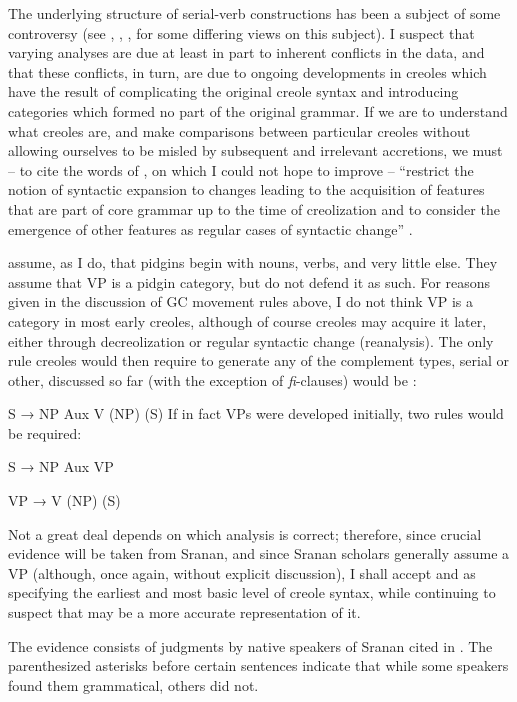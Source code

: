 The underlying structure of serial-verb constructions has been a subject of some controversy (see \citet{Williams1971,Williams1975}, \citet{Roberts1975}, \citet{Voorhoeve1975}, \citet{JansenEtAl1978} for some differing views on this subject). I suspect that varying analyses are due at least in part to inherent conflicts in the data, and that these conflicts, in turn, are due to ongoing developments in creoles which have the result of complicating the original creole syntax and intro\-ducing categories which formed no part of the original grammar. If we are to understand what creoles are, and make comparisons between particular creoles without allowing ourselves to be misled by sub\-sequent and irrelevant accretions, we must -- to cite the words of \citeauthor{KoopmanEtAl1981}, on which I could not hope to improve -- ``restrict the notion of syntactic expansion to changes leading to the acquisition of features that are part of core grammar up to the time of creolization and to consider the emergence of other features as regular cases of syntactic change'' \citep[218]{KoopmanEtAl1981}.

\citeauthor{KoopmanEtAl1981} assume, as I do, that pidgins begin with
nouns, verbs, and very little else. They assume that VP is a pidgin category, but do not defend it as such. For reasons given in the discussion of GC movement rules above, I do not think VP is a category in most early creoles, although of course creoles may acquire it later, either through decreolization or regular syntactic change (reanalysis). The only rule creoles would then require to generate any of the comple\-ment types, serial or other, discussed so far (with the exception of \textit{fi}-clauses) would be :

\ea\label{ex:2:236}
 S → NP Aux V (NP) (S)
\z
If in fact VPs were developed initially, two rules would be required:

\ea\label{ex:2:237}
S → NP Aux VP
\z

\ea\label{ex:2:238}
 VP → V (NP) (S)
\z

Not a great deal depends on which analysis is correct; therefore, since crucial evidence will be taken from Sranan, and since Sranan scholars generally assume a VP (although, once again, without explicit discussion), I shall accept  and  as specifying the earliest and most basic level of creole syntax, while continuing to suspect that  may be a more accurate representation of it.

The evidence consists of judgments by native speakers of Sranan cited in \citet{JansenEtAl1978}. The parenthesized asterisks before certain sentences indicate that while some speakers found them grammatical, others did not.

